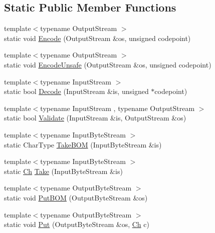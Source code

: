 \subsection*{Static Public Member Functions}
\begin{DoxyCompactItemize}
\item 
{\footnotesize template$<$typename Output\+Stream $>$ }\\static void \mbox{\hyperlink{structrapidjson_1_1_a_s_c_i_i_adac1c32ed7098e5814dc4b2d1b6f04b5}{Encode}} (Output\+Stream \&os, unsigned codepoint)
\item 
{\footnotesize template$<$typename Output\+Stream $>$ }\\static void \mbox{\hyperlink{structrapidjson_1_1_a_s_c_i_i_a0eee86da534d0652359a74caa084a0b7}{Encode\+Unsafe}} (Output\+Stream \&os, unsigned codepoint)
\item 
{\footnotesize template$<$typename Input\+Stream $>$ }\\static bool \mbox{\hyperlink{structrapidjson_1_1_a_s_c_i_i_aaec2b991fe580f147df60fe6eb15b3f0}{Decode}} (Input\+Stream \&is, unsigned $\ast$codepoint)
\item 
{\footnotesize template$<$typename Input\+Stream , typename Output\+Stream $>$ }\\static bool \mbox{\hyperlink{structrapidjson_1_1_a_s_c_i_i_a1d92c5e7540766a9fc03bebf788dab88}{Validate}} (Input\+Stream \&is, Output\+Stream \&os)
\item 
{\footnotesize template$<$typename Input\+Byte\+Stream $>$ }\\static Char\+Type \mbox{\hyperlink{structrapidjson_1_1_a_s_c_i_i_a0d3616276f046139c3628574f9b8ea0b}{Take\+B\+OM}} (Input\+Byte\+Stream \&is)
\item 
{\footnotesize template$<$typename Input\+Byte\+Stream $>$ }\\static \mbox{\hyperlink{structrapidjson_1_1_a_s_c_i_i_a2c1e49f42921027d58f1125a627cc5e5}{Ch}} \mbox{\hyperlink{structrapidjson_1_1_a_s_c_i_i_ad4ab53cc9d0c076d5548e7ed5be76f5b}{Take}} (Input\+Byte\+Stream \&is)
\item 
{\footnotesize template$<$typename Output\+Byte\+Stream $>$ }\\static void \mbox{\hyperlink{structrapidjson_1_1_a_s_c_i_i_a5da83adf5a57fa73144a128a80d10782}{Put\+B\+OM}} (Output\+Byte\+Stream \&os)
\item 
{\footnotesize template$<$typename Output\+Byte\+Stream $>$ }\\static void \mbox{\hyperlink{structrapidjson_1_1_a_s_c_i_i_a32e644c99e6658ae8c8f1578d8860eaf}{Put}} (Output\+Byte\+Stream \&os, \mbox{\hyperlink{structrapidjson_1_1_a_s_c_i_i_a2c1e49f42921027d58f1125a627cc5e5}{Ch}} c)
\end{DoxyCompactItemize}


